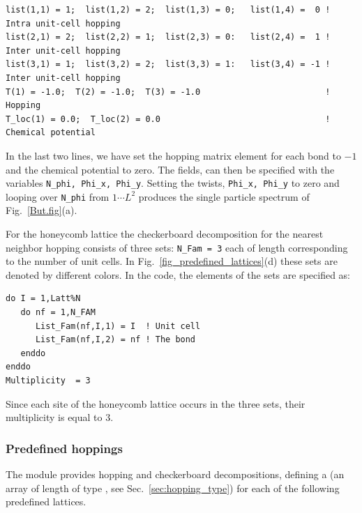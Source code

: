 \begin{lstlisting}[style=fortran,escapechar=\#]
list(1,1) = 1;  list(1,2) = 2;  list(1,3) = 0;   list(1,4) =  0 ! Intra unit-cell hopping
list(2,1) = 2;  list(2,2) = 1;  list(2,3) = 0:   list(2,4) =  1 ! Inter unit-cell hopping
list(3,1) = 1;  list(3,2) = 2;  list(3,3) = 1:   list(3,4) = -1 ! Inter unit-cell hopping
T(1) = -1.0;  T(2) = -1.0;  T(3) = -1.0                         ! Hopping
T_loc(1) = 0.0;  T_loc(2) = 0.0                                 ! Chemical potential 
\end{lstlisting} 
In the last two lines, we have set the hopping matrix element  for each bond to $-1$  and the chemical potential to zero.    The fields,   can then be specified   with the  variables   \texttt{N\_phi, Phi\_x, Phi\_y}.  Setting   the twists, 
\texttt{Phi\_x, Phi\_y}  to zero and  looping over \texttt{N\_phi}    from $ 1 \cdots L^2 $   produces  the single particle spectrum of  Fig.~\ref{But.fig}(a).  

For the honeycomb lattice  the checkerboard decomposition  for the nearest neighbor hopping consists of three  sets:  \texttt{N\_Fam = 3}  each of length   corresponding  to the number of unit cells.  In  Fig.~\ref{fig_predefined_lattices}(d)  
these sets are denoted by different colors. In the code, the elements of the sets are specified as:

\begin{lstlisting}[style=fortran] 
do I = 1,Latt%N
   do nf = 1,N_FAM
      List_Fam(nf,I,1) = I  ! Unit cell
      List_Fam(nf,I,2) = nf ! The bond 
   enddo
enddo
Multiplicity  = 3
\end{lstlisting}        
Since each site of the honeycomb lattice occurs in  the three sets, their multiplicity is equal to 3.  


\subsubsection{Predefined hoppings}

The  module provides hopping and checkerboard decompositions, defining a   (an array of length  of type  , see Sec.~\ref{sec:hopping_type}) for each of the following predefined lattices.

